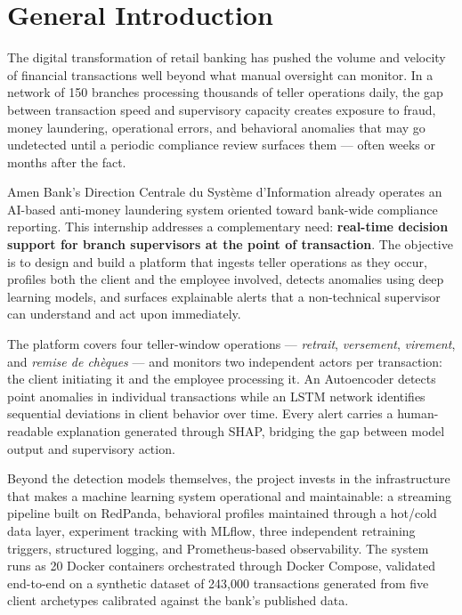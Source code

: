 \chapter*{General Introduction}

The digital transformation of retail banking has pushed the volume and velocity of financial transactions well beyond what manual oversight can monitor. In a network of 150 branches processing thousands of teller operations daily, the gap between transaction speed and supervisory capacity creates exposure to fraud, money laundering, operational errors, and behavioral anomalies that may go undetected until a periodic compliance review surfaces them --- often weeks or months after the fact.

Amen Bank's Direction Centrale du Syst\`eme d'Information already operates an AI-based anti-money laundering system oriented toward bank-wide compliance reporting. This internship addresses a complementary need: \textbf{real-time decision support for branch supervisors at the point of transaction}. The objective is to design and build a platform that ingests teller operations as they occur, profiles both the client and the employee involved, detects anomalies using deep learning models, and surfaces explainable alerts that a non-technical supervisor can understand and act upon immediately.

The platform covers four teller-window operations --- \emph{retrait}, \emph{versement}, \emph{virement}, and \emph{remise de ch\`eques} --- and monitors two independent actors per transaction: the client initiating it and the employee processing it. An Autoencoder detects point anomalies in individual transactions while an LSTM network identifies sequential deviations in client behavior over time. Every alert carries a human-readable explanation generated through SHAP, bridging the gap between model output and supervisory action.

Beyond the detection models themselves, the project invests in the infrastructure that makes a machine learning system operational and maintainable: a streaming pipeline built on RedPanda, behavioral profiles maintained through a hot/cold data layer, experiment tracking with MLflow, three independent retraining triggers, structured logging, and Prometheus-based observability. The system runs as 20 Docker containers orchestrated through Docker Compose, validated end-to-end on a synthetic dataset of 243{,}000 transactions generated from five client archetypes calibrated against the bank's published data.

